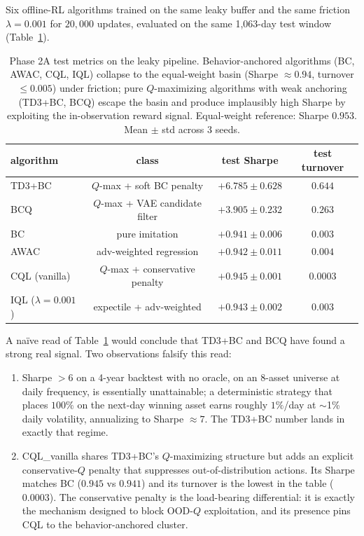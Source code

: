 Six offline-RL algorithms trained on the same leaky buffer and the
same friction $\lambda = 0.001$ for $20{,}000$ updates, evaluated on the
same 1{,}063-day test window (Table~\ref{tab:leak-differential}).

\begin{table}[t]
\centering
\caption{Phase 2A test metrics on the leaky pipeline. Behavior-anchored
algorithms (BC, AWAC, CQL, IQL) collapse to the equal-weight basin (Sharpe
$\approx 0.94$, turnover $\le 0.005$) under friction; pure
$Q$-maximizing algorithms with weak anchoring (TD3+BC, BCQ) escape the
basin and produce implausibly high Sharpe by exploiting the
in-observation reward signal.
Equal-weight reference: Sharpe $0.953$.
Mean $\pm$ std across 3 seeds.}
\label{tab:leak-differential}
\small
\begin{tabular}{lccc}
\toprule
algorithm           & class                              & test Sharpe          & test turnover \\
\midrule
TD3+BC              & $Q$-max + soft BC penalty           & $\boldsymbol{+6.785 \pm 0.628}$ & $0.644$ \\
BCQ                 & $Q$-max + VAE candidate filter      & $\boldsymbol{+3.905 \pm 0.232}$ & $0.263$ \\
\midrule
BC                  & pure imitation                     & $+0.941 \pm 0.006$  & $0.003$ \\
AWAC                & adv-weighted regression            & $+0.942 \pm 0.011$  & $0.004$ \\
CQL (vanilla)       & $Q$-max + conservative penalty     & $+0.945 \pm 0.001$  & $0.0003$ \\
IQL ($\lambda{=}0.001$) & expectile + adv-weighted       & $+0.943 \pm 0.002$  & $0.003$ \\
\bottomrule
\end{tabular}
\end{table}

A na\"ive read of Table~\ref{tab:leak-differential} would conclude
that TD3+BC and BCQ have found a strong real signal. Two observations
falsify this read:

\begin{enumerate}\setlength\itemsep{0pt}
  \item Sharpe $> 6$ on a 4-year backtest with no oracle, on an 8-asset
    universe at daily frequency, is essentially unattainable; a
    deterministic strategy that places $100\%$ on the next-day winning
    asset earns roughly $1\%$/day at $\sim$1\% daily volatility,
    annualizing to Sharpe $\approx 7$. The TD3+BC number lands in
    exactly that regime.
  \item CQL\_vanilla shares TD3+BC's $Q$-maximizing structure but adds
    an explicit conservative-$Q$ penalty that suppresses out-of-distribution
    actions. Its Sharpe matches BC ($0.945$ vs $0.941$) and its turnover
    is the lowest in the table ($0.0003$). The conservative penalty is
    the load-bearing differential: it is exactly the mechanism designed
    to block OOD-$Q$ exploitation, and its presence pins CQL to the
    behavior-anchored cluster.
\end{enumerate}

